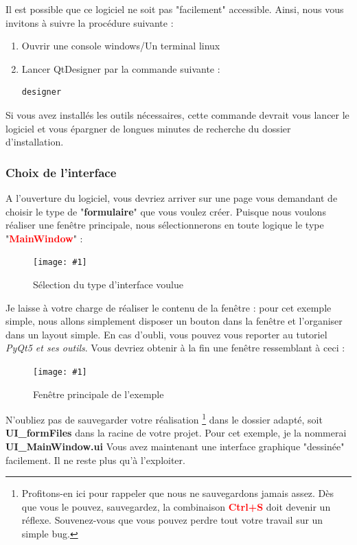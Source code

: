 \documentclass[12pt]{report}    %
\newcommand{\iImage}[3]{\begin{figure}[H]\centering\texttt{[image: \#1]}\caption{#2}\end{figure}}
\newcommand{\bold}[1]{{\bfseries #1}}
\newcommand{\italic}[1]{{\itshape #1}}
\newcommand{\rootIm}{images/ENIBSupervision/}
\begin{document}
Il est possible que ce logiciel ne soit pas "facilement" accessible. Ainsi, nous vous invitons à suivre la procédure suivante :
\begin{enumerate}
\item Ouvrir une console windows/Un terminal linux
\item Lancer QtDesigner par la commande suivante :
\begin{lstlisting}[language=bash]
designer
\end{lstlisting}
\end{enumerate}

Si vous avez installés les outils nécessaires, cette commande devrait vous lancer le logiciel et vous épargner de longues minutes de recherche du dossier d'installation.

\subsubsection{Choix de l'interface}

A l'ouverture du logiciel, vous devriez arriver sur une page vous demandant de choisir le type de "\bold{formulaire}" que vous voulez créer.\newline
Puisque nous voulons réaliser une fenêtre principale, nous sélectionnerons en toute logique le type "\bold{\textcolor{red}{MainWindow}}" :

\iImage{\rootIm enibSup_window_designerWidgetSelection_MainWindow.png}{Sélection du type d'interface voulue}{0.3}

Je laisse à votre charge de réaliser le contenu de la fenêtre : pour cet exemple simple, nous allons simplement disposer un bouton dans la fenêtre et l'organiser dans un layout simple. En cas d'oubli, vous pouvez vous reporter au tutoriel \italic{PyQt5 et ses outils}.\newline
Vous devriez obtenir à la fin une fenêtre ressemblant à ceci :

\iImage{\rootIm enibSup_window_MainWindowExample.png}{Fenêtre principale de l'exemple}{0.4}

N'oubliez pas de sauvegarder votre réalisation
\footnote{
Profitons-en ici pour rappeler que nous ne sauvegardons jamais assez. Dès que vous le pouvez, sauvegardez, la combinaison \bold{\textcolor{red}{Ctrl+S}} doit devenir un réflexe. Souvenez-vous que vous pouvez perdre tout votre travail sur un simple bug.
}
dans le dossier adapté, soit \bold{UI\_formFiles} dans la racine de votre projet. Pour cet exemple, je la nommerai \bold{UI\_MainWindow.ui}\newline
Vous avez maintenant une interface graphique "dessinée" facilement. Il ne reste plus qu'à l'exploiter.
\end{document}

